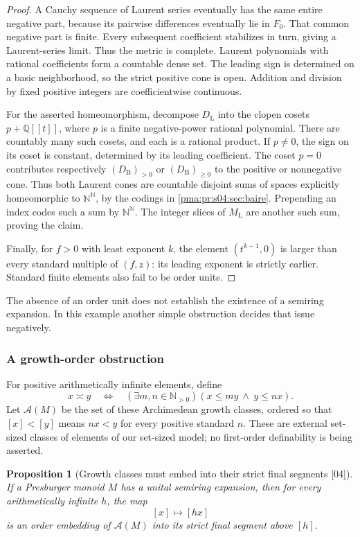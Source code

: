 \documentclass[11pt]{article}
\numberwithin{equation}{section}
\newtheorem{proposition}[proposition]{Proposition}
\theoremstyle{definition}
\theoremstyle{remark}
\newcommand{\N}{\mathbb N}
\newcommand{\Q}{\mathbb Q}
\newcommand{\Baire}{\N^{\N}}
\newcommand{\ML}{M_{\mathrm L}}
\newcommand{\src}[1]{\textup{\textsf{\small[#1]}}}
\begin{document}
\begin{proof}
A Cauchy sequence of Laurent series eventually has the same entire negative
part, because its pairwise differences eventually lie in $F_0$. That common
negative part is finite. Every subsequent coefficient stabilizes in turn,
giving a Laurent-series limit. Thus the metric is complete. Laurent
polynomials with rational coefficients form a countable dense set.
The leading sign is determined on a basic neighborhood, so the strict
positive cone is open. Addition and division by fixed positive integers
are coefficientwise continuous.

For the asserted homeomorphism, decompose $D_{\mathrm L}$ into the clopen
cosets $p+\Q[[t]]$, where $p$ is a finite negative-power rational
polynomial. There are countably many such cosets, and each is a rational
product. If $p\ne0$, the sign on its coset is constant, determined by its
leading coefficient. The coset $p=0$ contributes respectively
$(D_{\mathrm B})_{>0}$ or $(D_{\mathrm B})_{\geq0}$ to the positive or nonnegative
cone. Thus both Laurent cones are countable disjoint sums of spaces
explicitly homeomorphic to $\Baire$, by the codings in \cref{pma:pr:s04:sec:baire}.
Prepending an index codes such a sum by $\Baire$. The integer slices of
$\ML$ are another such sum, proving the claim.

Finally, for $f>0$ with least exponent $k$, the element $(t^{k-1},0)$ is
larger than every standard multiple of $(f,z)$: its leading exponent is
strictly earlier. Standard finite elements also fail to be order units.
\end{proof}

The absence of an order unit does not establish the existence of a
semiring expansion. In this example another simple obstruction decides
that issue negatively.

\subsubsection{A growth-order obstruction}

For positive arithmetically infinite elements, define
\[
 x\asymp y\quad\Longleftrightarrow\quad
 (\exists m,n\in\N_{>0})(x\leq my\ \wedge\ y\leq nx).
\]
Let $\mathcal A(M)$ be the set of these Archimedean growth classes, ordered
so that $[x]<[y]$ means $nx<y$ for every positive standard $n$. These are
external set-sized classes of elements of our set-sized model; no
first-order definability is being asserted.

\begin{proposition}[Growth classes must embed into their strict final segments \src{04}]
\label{pma:pr:prop:growthobstruction}
If a Presburger monoid $M$ has a unital semiring expansion, then for every
arithmetically infinite $h$, the map
\[
 [x]\longmapsto[hx]
\]
is an order embedding of $\mathcal A(M)$ into its strict final segment above
$[h]$.
\end{proposition}
\end{document}
